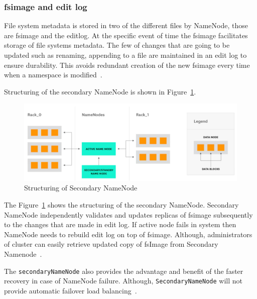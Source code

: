 \subsubsection{fsimage and edit log}
File system metadata is stored in two of the 
different files by NameNode, those are fsimage 
and the editlog. At the specific event of time 
the fsimage facilitates storage of file 
systems metadata. The few of changes that are going 
to be updated such as renaming, appending to a 
file are maintained in an edit log to ensure durability. 
This avoids redundant creation of the
new fsimage every time when a 
namespace is modified~\cite{hid-sp18-412-hadoop-architecture-overview}. 

Structuring of the secondary NameNode is 
shown in Figure~\ref{s:secnode}.

\begin{figure}[!ht]
\centering
\includegraphics[width=\textwidth]{images/StructureOfSecondaryNode.png}
\caption{Structuring of Secondary 
NameNode~\cite{hid-sp18-412-hadoop-architecture-overview}}\label{s:secnode}
\end{figure}

The Figure~\ref{s:secnode} shows the structuring of the secondary NameNode. 
Secondary NameNode independently validates and 
updates replicas of fsimage subsequently to the changes 
that are made in edit log. If active node fails in
system then NameNode needs to rebuild edit 
log on top of fsimage. Although, administrators of  
cluster can easily retrieve updated copy of
fsImage from Secondary 
Namenode~\cite{hid-sp18-412-hadoop-architecture-overview}.

The \verb|secondaryNameNode| also provides the advantage and 
benefit of the faster recovery in case of NameNode failure. 
Although, \verb|SecondaryNameNode|
will not provide automatic failover 
load balancing~\cite{hid-sp18-412-hadoop-architecture-overview}.


